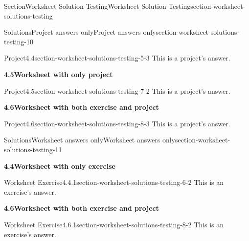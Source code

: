 \documentclass[oneside,10pt,]{article}
\numberwithin{equation}{section}
\begin{document}
\begin{sectionptx}{Section}{Worksheet Solution Testing}{}{Worksheet Solution Testing}{}{}{section-worksheet-solutions-testing}
\begin{solutions-subsection}{Solutions}{Project answers only}{}{Project answers only}{}{}{section-worksheet-solutions-testing-10}
\begin{projectsolution}{Project}{4.4}{}{section-worksheet-solutions-testing-5-3}
\noindent\hypertarget{section-worksheet-solutions-testing-5-3-2-main}{}This is a project's answer.%
\end{projectsolution}%
\par\medskip
\noindent\textbf{\normalsize{}4.5\space\textperiodcentered\space{}Worksheet with only project}
\begin{projectsolution}{Project}{4.5}{}{section-worksheet-solutions-testing-7-2}%
\noindent\hypertarget{section-worksheet-solutions-testing-7-2-2-main}{}This is a project's answer.%
\end{projectsolution}%
\par\medskip
\noindent\textbf{\normalsize{}4.6\space\textperiodcentered\space{}Worksheet with both exercise and project}
\begin{projectsolution}{Project}{4.6}{}{section-worksheet-solutions-testing-8-3}%
\noindent\hypertarget{section-worksheet-solutions-testing-8-3-2-main}{}This is a project's answer.%
\end{projectsolution}%
\end{solutions-subsection}
%
%
\typeout{************************************************}
\typeout{************************************************}
%
\begin{solutions-subsection}{Solutions}{Worksheet answers only}{}{Worksheet answers only}{}{}{section-worksheet-solutions-testing-11}
\par\medskip
\noindent\textbf{\normalsize{}4.4\space\textperiodcentered\space{}Worksheet with only exercise}
\begin{divisionsolution}{Worksheet Exercise}{4.4.1}{}{section-worksheet-solutions-testing-6-2}%
\noindent\hypertarget{section-worksheet-solutions-testing-6-2-2-main}{}This is an exercise's answer.%
\end{divisionsolution}%
\par\medskip
\noindent\textbf{\normalsize{}4.6\space\textperiodcentered\space{}Worksheet with both exercise and project}
\begin{divisionsolution}{Worksheet Exercise}{4.6.1}{}{section-worksheet-solutions-testing-8-2}%
\noindent\hypertarget{section-worksheet-solutions-testing-8-2-2-main}{}This is an exercise's answer.%
\end{divisionsolution}%
\end{solutions-subsection}
%
%
\typeout{************************************************}
\typeout{************************************************}

\end{sectionptx}
\end{document}
